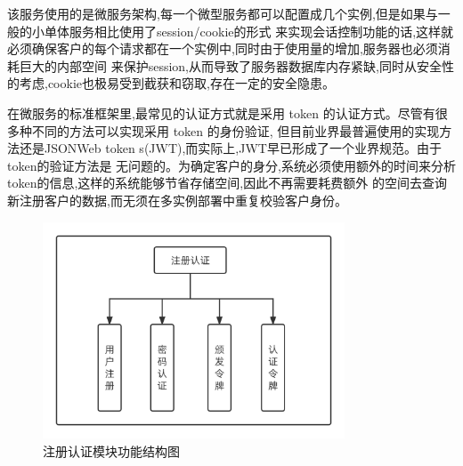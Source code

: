 


该服务使用的是微服务架构,每一个微型服务都可以配置成几个实例,但是如果与一般的小单体服务相比使用了session/cookie的形式
来实现会话控制功能的话,这样就必须确保客户的每个请求都在一个实例中,同时由于使用量的增加,服务器也必须消耗巨大的内部空间
来保护session,从而导致了服务器数据库内存紧缺,同时从安全性的考虑,cookie也极易受到截获和窃取,存在一定的安全隐患。

在微服务的标准框架里,最常见的认证方式就是采用 token 的认证方式。尽管有很多种不同的方法可以实现采用 token 的身份验证,
但目前业界最普遍使用的实现方法还是JSONWeb token s(JWT),而实际上,JWT早已形成了一个业界规范。由于token的验证方法是
无问题的。为确定客户的身分,系统必须使用额外的时间来分析token的信息,这样的系统能够节省存储空间,因此不再需要耗费额外
的空间去查询新注册客户的数据,而无须在多实例部署中重复校验客户身份。


\begin{figure}[h]
    \centering
    \includegraphics[width=0.8\textwidth]{my_figures/chapter4/注册认证模块功能结构图.png}
    \caption{注册认证模块功能结构图}
    \label{fig:注册认证模块功能结构图}
\end{figure}


